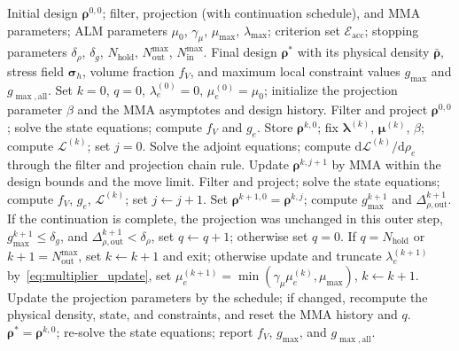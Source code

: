 \begin{algorithm}[!htbp]
\caption{Nested two-loop optimization procedure based on ALM--MMA}
\label{alg:stress_alm_mma}
\begin{algorithmic}[1]
\Require Initial design $\boldsymbol{\rho}^{0,0}$; filter, projection (with continuation schedule), and MMA parameters; ALM parameters $\mu_0$, $\gamma_\mu$, $\mu_{\max}$, $\lambda_{\max}$; criterion set $\mathcal{E}_{\mathrm{acc}}$; stopping parameters $\delta_\rho$, $\delta_g$, $N_{\mathrm{hold}}$, $N_{\mathrm{out}}^{\max}$, $N_{\mathrm{in}}^{\max}$.
\Ensure Final design $\boldsymbol{\rho}^*$ with its physical density $\bar{\boldsymbol{\rho}}$, stress field $\boldsymbol{\sigma}_h$, volume fraction $f_V$, and maximum local constraint values $g_{\max}$ and $g_{\max,\mathrm{all}}$.
\State Set $k = 0$, $q = 0$, $\lambda_e^{(0)} = 0$, $\mu_e^{(0)} = \mu_0$; initialize the projection parameter $\beta$ and the MMA asymptotes and design history.
\State Filter and project $\boldsymbol{\rho}^{0,0}$; solve the state equations; compute $f_V$ and $g_e$.
\State Store $\boldsymbol{\rho}^{k,0}$; fix $\boldsymbol{\lambda}^{(k)}$, $\boldsymbol{\mu}^{(k)}$, $\beta$; compute $\mathcal{L}^{(k)}$; set $j = 0$.
\State Solve the adjoint equations; compute $\mathrm{d}\mathcal{L}^{(k)}/\mathrm{d}\rho_e$ through the filter and projection chain rule.
\State Update $\boldsymbol{\rho}^{k,j+1}$ by MMA within the design bounds and the move limit.
\State Filter and project; solve the state equations; compute $f_V$, $g_e$, $\mathcal{L}^{(k)}$; set $j \leftarrow j + 1$.
\EndWhile
\State Set $\boldsymbol{\rho}^{k+1,0} = \boldsymbol{\rho}^{k,j}$; compute $g_{\max}^{k+1}$ and $\Delta_{\rho,\mathrm{out}}^{k+1}$.
\State If the continuation is complete, the projection was unchanged in this outer step, $g_{\max}^{k+1} \le \delta_g$, and $\Delta_{\rho,\mathrm{out}}^{k+1} < \delta_\rho$, set $q \leftarrow q + 1$; otherwise set $q = 0$.
\State If $q = N_{\mathrm{hold}}$ or $k + 1 = N_{\mathrm{out}}^{\max}$, set $k \leftarrow k + 1$ and exit; otherwise update and truncate $\lambda_e^{(k+1)}$ by~\eqref{eq:multiplier_update}, set $\mu_e^{(k+1)} = \min(\gamma_\mu \mu_e^{(k)}, \mu_{\max})$, $k \leftarrow k + 1$.
\State Update the projection parameters by the schedule; if changed, recompute the physical density, state, and constraints, and reset the MMA history and $q$.
\EndWhile
\State \Return $\boldsymbol{\rho}^* = \boldsymbol{\rho}^{k,0}$; re-solve the state equations; report $f_V$, $g_{\max}$, and $g_{\max,\mathrm{all}}$.
\end{algorithmic}
\end{algorithm}

